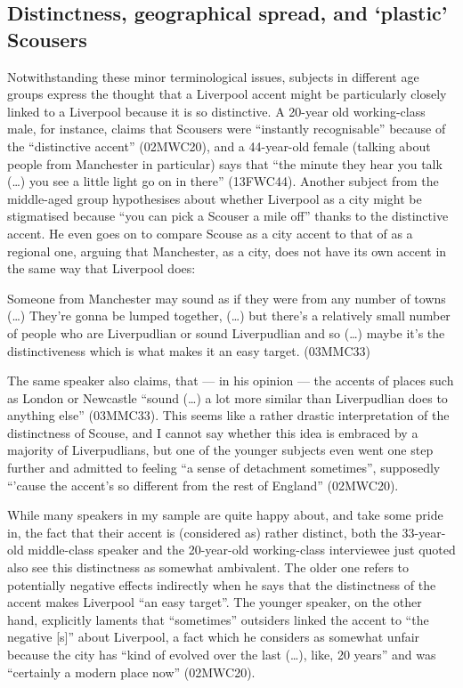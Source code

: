 \subsection{Distinctness, geographical spread, and `plastic' Scousers}

Notwithstanding these minor terminological issues, subjects in different age groups express the thought that a Liverpool accent might be particularly closely linked to a Liverpool  because it is so distinctive.
A 20-year old working-class male, for instance, claims that Scousers were ``instantly recognisable'' because of the ``distinctive accent'' (02MWC20), and a 44-year-old female (talking about people from Manchester in particular) says that ``the minute they hear you talk (\ldots) you see a little light go on in there'' (13FWC44).
Another subject from the middle-aged group hypothesises about whether Liverpool as a city might be stigmatised because ``you can pick a Scouser a mile off'' thanks to the distinctive accent.
He even goes on to compare Scouse as a city accent to that of  as a regional one, arguing that Manchester, as a city, does not have its own accent in the same way that Liverpool does:

\begin{example}
	Someone from Manchester may sound as if they were from any number of towns (\ldots) They're gonna be lumped together, (\ldots) but there's a relatively small number of people who are Liverpudlian or sound Liverpudlian and so (\ldots) maybe it's the distinctiveness which is what makes it an easy target. (03MMC33)
\end{example}

The same speaker also claims, that --- in his opinion --- the accents of places such as London or Newcastle ``sound (\ldots) a lot more similar than Liverpudlian does to anything else'' (03MMC33).
This seems like a rather drastic interpretation of the distinctness of Scouse, and I cannot say whether this idea is embraced by a majority of Liverpudlians, but one of the younger subjects even went one step further and admitted to feeling ``a sense of detachment sometimes'', supposedly ``'cause the accent's so different from the rest of England'' (02MWC20).

While many speakers in my sample are quite happy about, and take some pride in, the fact that their accent is (considered as) rather distinct, both the 33-year-old middle-class speaker and the 20-year-old working-class interviewee just quoted also see this distinctness as somewhat ambivalent.
The older one refers to potentially negative effects indirectly when he says that the distinctness of the accent makes Liverpool ``an easy target''.
The younger speaker, on the other hand, explicitly laments that ``sometimes'' outsiders linked the accent to ``the negative [s]'' about Liverpool, a fact which he considers as somewhat unfair because the city has ``kind of evolved over the last (\ldots), like, 20 years'' and was ``certainly a modern place now'' (02MWC20).

